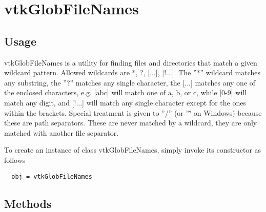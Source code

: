 \section{vtkGlobFileNames}

\subsection{Usage}

 vtkGlobFileNames is a utility for finding files and directories
 that match a given wildcard pattern.  Allowed wildcards are
 *, ?, [...], [!...]. The ''*'' wildcard matches any substring,
 the ''?'' matches any single character, the [...] matches any one of
 the enclosed characters, e.g. [abc] will match one of a, b, or c,
 while [0-9] will match any digit, and [!...] will match any single
 character except for the ones within the brackets.  Special
 treatment is given to ''/'' (or ''\'' on Windows) because these are
 path separators.  These are never matched by a wildcard, they are
 only matched with another file separator.

To create an instance of class vtkGlobFileNames, simply
invoke its constructor as follows
\begin{verbatim}
  obj = vtkGlobFileNames
\end{verbatim}
\subsection{Methods}

